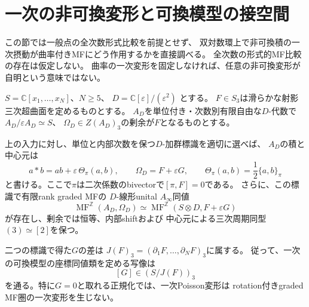 \section{一次の非可換変形と可換模型の接空間}
\label{fpk:sec:first-order}

この節では一般点の全次数形式比較を前提とせず、
双対数環上で非可換積の一次摂動が曲率付きMFにどう作用するかを直接調べる。
全次数の形式的MF比較の存在は仮定しない。
曲率の一次変形を固定しなければ、任意の非可換変形が自明という意味ではない。

$S=\mathbb C[x_1,\ldots,x_N]$、$N\ge5$、
$D=\mathbb C[\varepsilon]/(\varepsilon^2)$ とする。
$F\in S_3$は滑らかな射影三次超曲面を定めるものとする。
$A_D$を単位付き・次数別有限自由な$D$-代数で
$A_D/\varepsilon A_D\simeq S$、
$\Omega_D\in Z(A_D)_3$の剰余が$F$となるものとする。

\begin{theorem}[一次Poisson方向の曲率付き消滅]
\label{fpk:thm:infinitesimal}
上の入力に対し、単位と内部次数を保つ$D$-加群標識を適切に選べば、
$A_D$の積と中心元は
\begin{equation}\label{fpk:eq:normal}
 a*b=ab+\varepsilon\,\Theta_\pi(a,b),\qquad
 \Omega_D=F+\varepsilon G,\qquad
 \Theta_\pi(a,b)=\frac12\{a,b\}_\pi
\end{equation}
と書ける。ここで$\pi$は二次係数のbivectorで$[\pi,F]=0$である。
さらに、この標識で有限rank graded MFの
$D$-線形unital $A_\infty$同値
\begin{equation}\label{fpk:eq:equivalence}
 \operatorname{MF}^{\mathbb Z}(A_D,\Omega_D)
 \simeq
 \operatorname{MF}^{\mathbb Z}(S\otimes D,F+\varepsilon G)
\end{equation}
が存在し、剰余では恒等、内部shiftおよび
中心元による三次周期同型$(3)\simeq[2]$を保つ。

二つの標識で得た$G$の差は
$J(F)_3=(\partial_1F,\ldots,\partial_NF)_3$に属する。
従って、一次の可換模型の座標同値類を定める写像は
\begin{equation}\label{fpk:eq:tangent}
 [G]\in(S/J(F))_3
\end{equation}
を通る。特に$G=0$と取れる正規化では、一次Poisson変形は
rotation付きgraded MF圏の一次変形を生じない。
\end{theorem}

